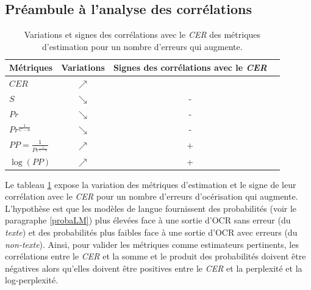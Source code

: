 \documentclass[10pt,twoside]{article}
\begin{document}
    \subsection{Préambule à l'analyse des corrélations}
    
        \begin{table}[h]
        \begin{center}
        \begin{tabular}{|l|c|c|c|}
        \hline
        \textbf{Métriques}  & \textbf{Variations} & \textbf{Signes des corrélations avec le \textit{CER}}    \\\hline
        $CER$  & $\nearrow$      &     \\ 
        $S$    & $\searrow$     & -   \\ 
        $Pr$    & $\searrow$     & -   \\
        $Pr^\frac{1}{C-n}$   & $\searrow$    & -    \\
        $PP=\frac{1}{Pr ^{\frac{1}{C-n}}}$ & $\nearrow$   & +   \\ 
        $\log \left (   PP   \right )$  & $\nearrow$      & + \\ 
        \hline
        \end{tabular}
        \caption{Variations et signes des corrélations avec le \textit{CER} des métriques d'estimation pour un nombre d'erreurs qui augmente.} \label{tab:var_cor}
        \end{center}
        \end{table}

    Le tableau \ref{tab:var_cor} expose la variation des métriques d'estimation et le signe de leur 
    corrélation avec le \textit{CER} pour un nombre d'erreurs d'océrisation qui augmente. L'hypothèse est que les
    modèles de langue fournissent des probabilités (voir le paragraphe \ref{probaLM})
    plus élevées face à une sortie d'OCR sans erreur (du \textit{texte}) et des
    probabilités plus faibles face à une sortie d'OCR avec erreurs (du \textit{non-texte}). Ainsi, pour valider les métriques comme estimateurs pertinents, les corrélations entre le \textit{CER} et la somme et le produit des 
    probabilités doivent être négatives alors qu'elles doivent être positives entre le \textit{CER}
    et la perplexité et la log-perplexité.
    
\end{document}
